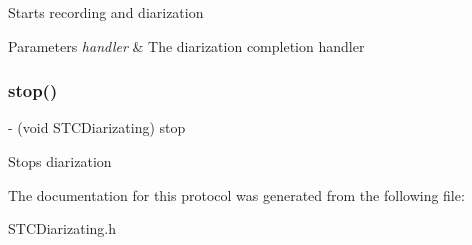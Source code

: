 Starts recording and diarization 
\begin{DoxyParams}{Parameters}
{\em handler} & The diarization completion handler \\
\hline
\end{DoxyParams}
\hypertarget{protocol_s_t_c_diarizating_01-p_a0f4cd3cf11e87cbcfc4c4e96f49a74ba}{}\label{protocol_s_t_c_diarizating_01-p_a0f4cd3cf11e87cbcfc4c4e96f49a74ba} 
\subsubsection{\texorpdfstring{stop()}{stop()}}
{\footnotesize\ttfamily -\/ (void S\+T\+C\+Diarizating) stop \begin{DoxyParamCaption}{ }\end{DoxyParamCaption}}

Stops diarization 

The documentation for this protocol was generated from the following file\+:\begin{DoxyCompactItemize}
\item 
S\+T\+C\+Diarizating.\+h\end{DoxyCompactItemize}
